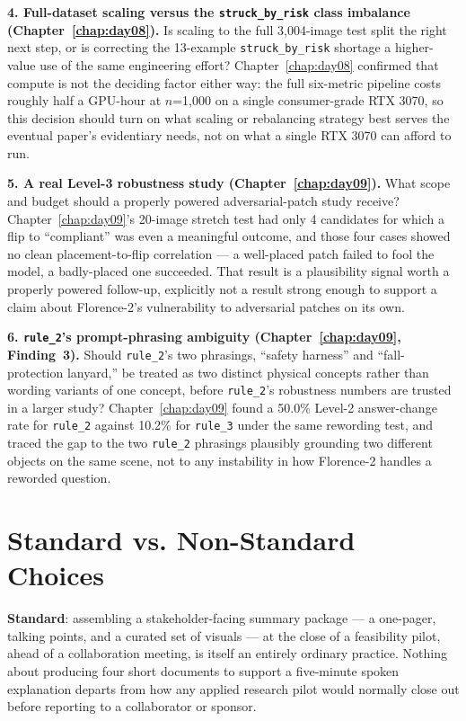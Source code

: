 \textbf{4. Full-dataset scaling versus the \texttt{struck\_by\_risk} class imbalance
(Chapter~\ref{chap:day08}).} Is scaling to the full 3,004-image test split the right next step,
or is correcting the 13-example \texttt{struck\_by\_risk} shortage a higher-value use of the
same engineering effort? Chapter~\ref{chap:day08} confirmed that compute is not the deciding
factor either way: the full six-metric pipeline costs roughly half a GPU-hour at $n$=1,000 on a
single consumer-grade RTX 3070, so this decision should turn on what scaling or rebalancing
strategy best serves the eventual paper's evidentiary needs, not on what a single RTX 3070 can
afford to run.

\textbf{5. A real Level-3 robustness study (Chapter~\ref{chap:day09}).} What scope and budget
should a properly powered adversarial-patch study receive? Chapter~\ref{chap:day09}'s 20-image
stretch test had only 4 candidates for which a flip to ``compliant'' was even a meaningful
outcome, and those four cases showed no clean placement-to-flip correlation --- a well-placed
patch failed to fool the model, a badly-placed one succeeded. That result is a plausibility
signal worth a properly powered follow-up, explicitly not a result strong enough to support a
claim about Florence-2's vulnerability to adversarial patches on its own.

\textbf{6. \texttt{rule\_2}'s prompt-phrasing ambiguity (Chapter~\ref{chap:day09}, Finding~3).}
Should \texttt{rule\_2}'s two phrasings, ``safety harness'' and ``fall-protection lanyard,'' be
treated as two distinct physical concepts rather than wording variants of one concept, before
\texttt{rule\_2}'s robustness numbers are trusted in a larger study? Chapter~\ref{chap:day09}
found a 50.0\% Level-2 answer-change rate for \texttt{rule\_2} against 10.2\% for \texttt{rule\_3}
under the same rewording test, and traced the gap to the two \texttt{rule\_2} phrasings
plausibly grounding two different objects on the same scene, not to any instability in how
Florence-2 handles a reworded question.

\section{Standard vs. Non-Standard Choices}

\textbf{Standard}: assembling a stakeholder-facing summary package --- a one-pager, talking
points, and a curated set of visuals --- at the close of a feasibility pilot, ahead of a
collaboration meeting, is itself an entirely ordinary practice. Nothing about producing four
short documents to support a five-minute spoken explanation departs from how any applied
research pilot would normally close out before reporting to a collaborator or sponsor.

